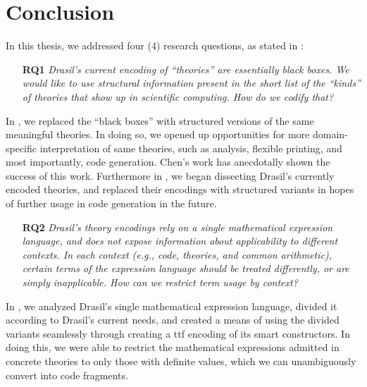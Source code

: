 \chapter{Conclusion}
\label{chap:conclusion}

In this thesis, we addressed four (4) research questions, as stated in
:

\begin{enumerate}

    \item[\textbf{RQ1}] \textit{Drasil's current encoding of ``theories'' are
          essentially black boxes. We would like to use structural information
          present in the short list of the ``kinds'' of theories that show up in
          scientific computing. How do we codify that?}

\end{enumerate}

In , we replaced the ``black boxes'' with structured
versions of the same meaningful theories. In doing so, we opened up
opportunities for more domain-specific interpretation of same theories, such as
analysis, flexible printing, and most importantly, code generation. Chen's work
\cite{Chen2022MEng} has anecdotally shown the success of this work. Furthermore
in , we began dissecting Drasil's currently encoded
theories, and replaced their encodings with structured variants in hopes of
further usage in code generation in the future.

\begin{enumerate}
    
    \item[\textbf{RQ2}] \textit{Drasil's theory encodings rely on a single
          mathematical expression language, and does not expose information
          about applicability to different contexts. In each context (e.g.,
          code, theories, and common arithmetic), certain terms of the
          expression language should be treated differently, or are simply
          inapplicable. How can we restrict term usage by context?}

\end{enumerate}

In , we analyzed Drasil's single mathematical
expression language, divided it according to Drasil's current needs, and created
a means of using the divided variants seamlessly through creating a \acs{ttf}
encoding of its smart constructors. In doing this, we were able to restrict the
mathematical expressions admitted in concrete theories to only those with
definite values, which we can unambiguously convert into code fragments.

